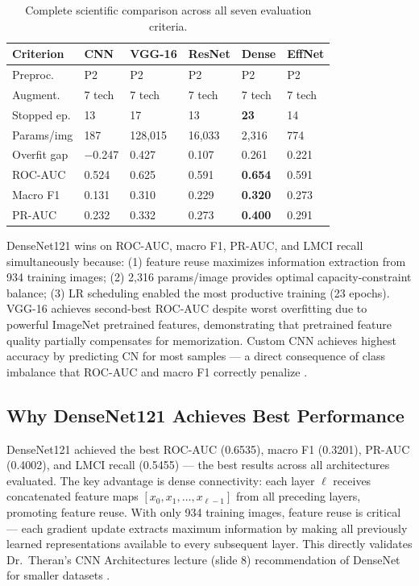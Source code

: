 \documentclass[12pt, a4paper]{article}
\begin{document}
\begin{table}[H]
\centering
\caption{Complete scientific comparison across
all seven evaluation criteria.}
\label{tab:fullcompare}
\begin{tabular}{p{2cm}p{1.5cm}p{1.5cm}p{1.5cm}
                p{1.5cm}p{1.5cm}}
\toprule
\textbf{Criterion}
    & \textbf{CNN}
    & \textbf{VGG-16}
    & \textbf{ResNet}
    & \textbf{Dense}
    & \textbf{EffNet}\\
\midrule
Preproc.    & P2 & P2 & P2 & P2 & P2\\
Augment.    & 7 tech & 7 tech & 7 tech & 7 tech & 7 tech\\
Stopped ep. & 13 & 17 & 13 & \textbf{23} & 14\\
Params/img  & 187 & 128,015 & 16,033 & 2,316 & 774\\
Overfit gap & $-$0.247 & 0.427 & 0.107 & 0.261 & 0.221\\
ROC-AUC     & 0.524 & 0.625 & 0.591 & \textbf{0.654} & 0.591\\
Macro F1    & 0.131 & 0.310 & 0.229 & \textbf{0.320} & 0.273\\
PR-AUC      & 0.232 & 0.332 & 0.273 & \textbf{0.400} & 0.291\\
\bottomrule
\end{tabular}
\end{table}

DenseNet121 wins on ROC-AUC, macro F1, PR-AUC,
and LMCI recall simultaneously because: (1) feature
reuse maximizes information extraction from 934
training images; (2) 2,316 params/image provides
optimal capacity-constraint balance; (3) LR
scheduling enabled the most productive training
(23 epochs). VGG-16 achieves second-best ROC-AUC
despite worst overfitting due to powerful ImageNet
pretrained features, demonstrating that pretrained
feature quality partially compensates for
memorization. Custom CNN achieves highest accuracy
by predicting CN for most samples --- a direct
consequence of class imbalance that ROC-AUC and
macro F1 correctly penalize \cite{theran2026metrics}.

\subsection{Why DenseNet121 Achieves Best Performance}

DenseNet121 achieved the best ROC-AUC (0.6535), macro F1
(0.3201), PR-AUC (0.4002), and LMCI recall (0.5455) ---
the best results across all architectures evaluated. The
key advantage is dense connectivity: each layer $\ell$
receives concatenated feature maps $[x_0, x_1, \ldots,
x_{\ell-1}]$ from all preceding layers, promoting feature
reuse. With only 934 training images, feature reuse is
critical --- each gradient update extracts maximum
information by making all previously learned
representations available to every subsequent layer.
This directly validates Dr.\ Theran's CNN Architectures
lecture (slide 8) recommendation of DenseNet for smaller
datasets \cite{theran2026cnn}.
\end{document}
